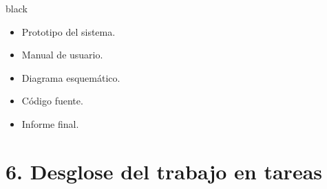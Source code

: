 \documentclass[11pt]{charter}
\begin{document}
\begin{consigna}{black}
\vspace{-35px}
\begin{itemize}
\item Prototipo del sistema.
\item Manual de usuario.
\item Diagrama esquemático.
\item Código fuente.
\item Informe final.

\end{itemize}

\end{consigna}
\vspace{-10px}
\section{6. Desglose del trabajo en tareas}
\label{sec:wbs}
\end{document}
